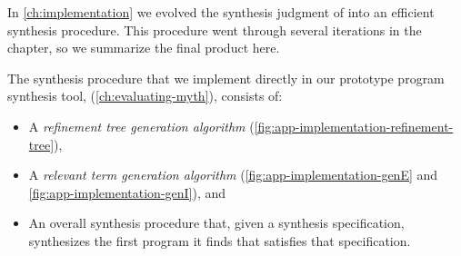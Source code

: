 In \autoref{ch:implementation} we evolved the synthesis judgment of \mlsyn{} into an efficient synthesis procedure.
This procedure went through several iterations in the chapter, so we summarize the final product here.

The synthesis procedure that we implement directly in our prototype program synthesis tool, \myth{} (\autoref{ch:evaluating-myth}), consists of:
\begin{itemize}
  \item A \emph{refinement tree generation algorithm} (\autoref{fig:app-implementation-refinement-tree}),
  \item A \emph{relevant term generation algorithm} (\autoref{fig:app-implementation-genE} and \autoref{fig:app-implementation-genI}), and
  \item An overall synthesis procedure that, given a synthesis specification, synthesizes the first program it finds that satisfies that specification.
\end{itemize}

